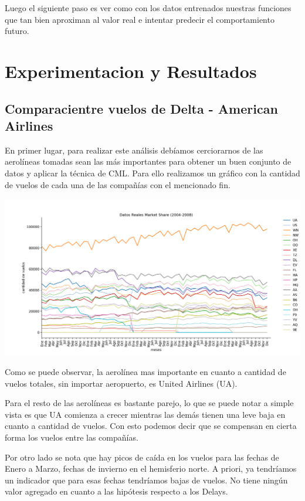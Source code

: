 \documentclass{endm}
\begin{document}
Luego el siguiente paso es ver como con los datos entrenados nuestras funciones que tan bien aproximan al valor real e intentar predecir el comportamiento futuro.

\section{Experimentacion y Resultados}
\subsection{Comparaci\on entre vuelos de Delta - American Airlines}
En primer lugar, para realizar este análisis debíamos cerciorarnos de las aerolíneas tomadas sean las más importantes para obtener un buen conjunto de datos y aplicar la técnica de CML. Para ello realizamos un gráfico con la cantidad de vuelos de cada una de las compañías con el mencionado fin.

\begin{center}
\includegraphics[scale=0.5]{imagenes/nuevas/MarketShare.png}
\end{center}

Como se puede observar, la aerolínea mas importante en cuanto a cantidad de vuelos totales, sin importar aeropuerto, es United Airlines (UA).

Para el resto de las aerolíneas es bastante parejo, lo que se puede notar a simple vista es que UA comienza a crecer mientras las demás tienen una leve baja en cuanto a cantidad de vuelos. Con esto podemos decir que se compensan en cierta forma los vuelos entre las compañías.

Por otro lado se nota que hay picos de caída en los vuelos para las fechas de Enero a Marzo, fechas de invierno en el hemisferio norte. A priori, ya tendríamos un indicador que para esas fechas tendríamos bajas de vuelos. No tiene ningún valor agregado en cuanto a las hipótesis respecto a los Delays.
\end{document}
